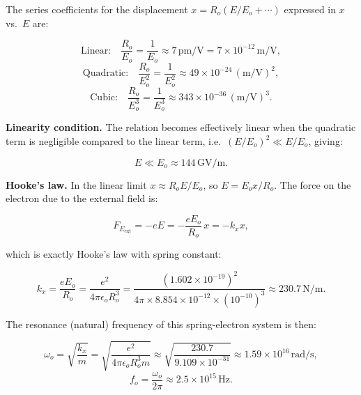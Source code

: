 The series coefficients for the displacement $x = R_o(E/E_o + \cdots)$ expressed in $x$ vs.\ $E$ are:

\begin{equation*}
  \text{Linear:}\quad \frac{R_o}{E_o} = \frac{1}{E_o} \approx 7\,\text{pm/V} = 7\times10^{-12}\,\text{m/V},
\end{equation*}
\begin{equation*}
  \text{Quadratic:}\quad \frac{R_o}{E_o^2} = \frac{1}{E_o^2} \approx 49\times10^{-24}\,(\text{m/V})^2,
\end{equation*}
\begin{equation*}
  \text{Cubic:}\quad \frac{R_o}{E_o^3} = \frac{1}{E_o^3} \approx 343\times10^{-36}\,(\text{m/V})^3.
\end{equation*}

\textbf{Linearity condition.} The relation becomes effectively linear when the quadratic term is negligible compared to the linear term, i.e.\ $(E/E_o)^2 \ll E/E_o$, giving:

\begin{equation*}
  \boxed{E \ll E_o \approx 144\,\text{GV/m}.}
\end{equation*}

\textbf{Hooke's law.} In the linear limit $x \approx R_oE/E_o$, so $E = E_ox/R_o$. The force on the electron due to the external field is:

\begin{equation*}
  F_{E_{\mathrm{ext}}} = -eE = -\frac{eE_o}{R_o}\,x = -k_x x,
\end{equation*}

which is exactly Hooke's law with spring constant:

\begin{equation*}
  k_x = \frac{eE_o}{R_o} = \frac{e^2}{4\pi\epsilon_o R_o^3}
  = \frac{(1.602\times10^{-19})^2}{4\pi\times8.854\times10^{-12}\times(10^{-10})^3}
  \approx 230.7\,\text{N/m}.
\end{equation*}

The resonance (natural) frequency of this spring-electron system is then:

\begin{equation*}
  \omega_o = \sqrt{\frac{k_x}{m}}
  = \sqrt{\frac{e^2}{4\pi\epsilon_o R_o^3 m}}
  \approx \sqrt{\frac{230.7}{9.109\times10^{-31}}}
  \approx 1.59\times10^{16}\,\text{rad/s},
\end{equation*}
\begin{equation*}
  \boxed{f_o = \frac{\omega_o}{2\pi} \approx 2.5\times10^{15}\,\text{Hz}.}
\end{equation*}


